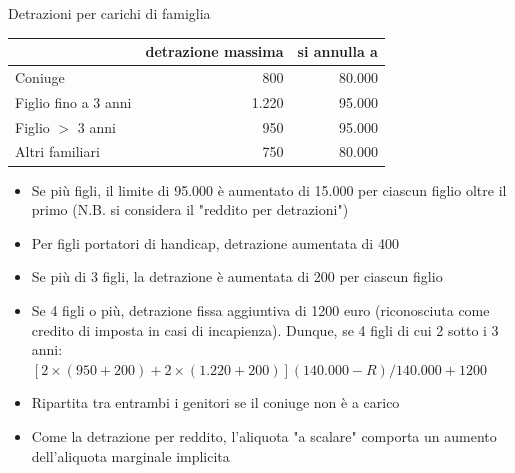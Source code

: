 \documentclass[aspectratio=64,12pt]{beamer}
\newcommand\€{\,\text{€}}
\begin{document}
\begin{frame}{Detrazioni per carichi di famiglia}
\begin{center}
\begin{tabular}{lrr}
 & detrazione massima & si annulla a\\[0pt]
\hline
Coniuge & 800 & 80.000\\[0pt]
Figlio fino a 3 anni & 1.220 & 95.000\\[0pt]
Figlio $>$ 3 anni & 950 & 95.000\\[0pt]
Altri familiari & 750 & 80.000\\[0pt]
\end{tabular}
\end{center}

\begin{itemize}
\item Se più figli, il limite di 95.000 è aumentato di 15.000 per ciascun figlio
oltre il primo (N.B. si considera il "reddito per detrazioni")
\item Per figli portatori di handicap, detrazione aumentata di 400
\item Se più di 3 figli, la detrazione è aumentata di 200 per ciascun figlio
\item Se 4 figli o più, detrazione fissa aggiuntiva di 1200 euro (riconosciuta
come credito di imposta in casi di incapienza). Dunque, se 4 figli di cui 2 sotto i 3 anni:
$[2\times(950+200)+2\times(1.220+200)](140.000-R)/140.000+1200$
\item Ripartita tra entrambi i genitori se il coniuge non è a carico
\item Come la detrazione per reddito, l'aliquota "a scalare" comporta un aumento
dell'aliquota marginale implicita
\end{itemize}
\end{frame}
\end{document}
